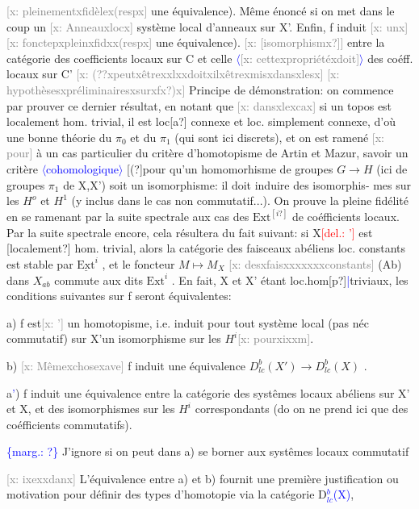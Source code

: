 \documentclass[11pt]{article}
\newcommand{\hand}[1]{\textcolor{blue}{#1}}
\newcommand{\inserted}[2][]{\textcolor{blue}{$\langle$#2$\rangle$}}
\newcommand{\margin}[1]{\textcolor{blue}{\{\textsf{marg.:} #1\}}}
\newcommand{\deleted}[1]{\textcolor{red}{[\textsf{del.:} #1]}}
\newcommand{\xout}[1]{\textcolor{gray}{[\textsf{x:} #1]}}
\newcommand{\unsure}[1]{[#1?]}
\begin{document}
\xout{pleinementxfidèlex(respx} une équivalence). Même énoncé si on met dans le
coup un \xout{Anneauxlocx} système local d'anneaux sur X'. Enfin, f induit \xout{unx}
\xout{fonctepxpleinxfidxx(respx} une équivalence).
\xout{\unsure{isomorphismx}} entre la catégorie des coefficients locaux sur C et celle
\inserted[typed]{\xout{cettexpropriétéxdoit}}
des coéff. locaux sur C' \xout{(??xpeutxêtrexxlxxdoitxilxêtrexmisxdansxlesx}
\xout{hypothèsesxpréliminairesxsurxfx?)x} Principe de démonstration: on commence
par prouver ce dernier résultat, en notant que \xout{dansxlexcax} si un topos est
localement hom. trivial, il est loc\unsure{a} connexe et loc. simplement connexe,
d'où une bonne théorie du $\pi_0$ et du $\pi_1$ (qui sont ici discrets), et on est
ramené \xout{pour} à un cas particulier du critère d'homotopisme de Artin et
Mazur, savoir un critère \inserted[typed]{cohomologique} \unsure{(}pour qu'un homomorhisme de groupes $G\to H$ (ici de
groupes $\pi_1$ de X,X') soit un isomorphisme: il doit induire des isomorphis-%
mes sur les $H^{o}$ et $H^{1}$ (y inclus dans le cas non commutatif...). On prouve
la pleine fidélité en se ramenant par la suite spectrale aux cas des $\mathrm{Ext}^{\unsure{i}}$
de coéfficients locaux. Par la suite spectrale encore, cela résultera du
fait suivant: si X\deleted{'} est \unsure{localement} hom. trivial, alors la catégorie des
faisceaux abéliens loc. constants  est stable par $\underline{\mathrm{Ext}}^{i}$ , et le foncteur
$M\mapsto M_{X}$ \xout{desxfaisxxxxxxxconstants} (Ab) dans $X_{ab}$ commute aux dits $\mathrm{Ext}^{i}$ .
En fait, X et X' étant loc.hom\unsure{p}\hand{|}triviaux, les conditions suivantes sur f
seront équivalentes:

a) f est\xout{'} un homotopisme, i.e.  induit pour tout système local (pas
néc commutatif) sur X'un isomorphisme sur les $H^{i}$\xout{pourxixxm}.

b) \xout{Mêmexchosexave} f induit une équivalence $D^{b}_{lc}(X')\longrightarrow D^{b}_{lc}(X)$ .

a\hand{'}) f induit une équivalence entre la catégorie des systêmes locaux
abéliens sur X' et X, et des isomorphismes sur les $H^{i}$ correspondants (do
on ne prend ici que des coéfficients commutatifs).

\margin{?} J'ignore si on peut dans a) se borner aux systêmes locaux commutatif

\xout{ixexxdanx}
L'équivalence entre a) et b) fournit une première justification ou
motivation pour définir des types d'homotopie via la catégorie D\hand{$^{b}_{lc}$(X)},
\end{document}
